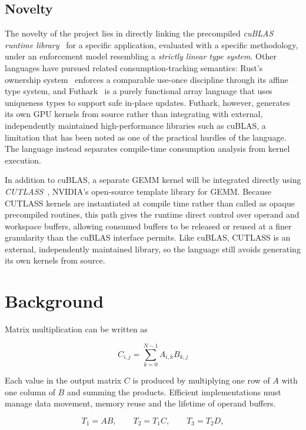\documentclass[a4paper]{article}
\begin{document}
	\subsection{Novelty}
	
	The novelty of the project lies in directly linking the precompiled \emph{cuBLAS runtime library}~\cite{cublas} for a specific application, evaluated with a specific methodology, under an enforcement model resembling a \emph{strictly linear type system}. Other languages have pursued related consumption-tracking semantics: Rust's ownership system~\cite{rust} enforces a comparable use-once discipline through its affine type system, and Futhark~\cite{futhark} is a purely functional array language that uses uniqueness types to support safe in-place updates. Futhark, however, generates its own GPU kernels from source rather than integrating with external, independently maintained high-performance libraries such as cuBLAS, a limitation that has been noted as one of the practical hurdles of the language. The language instead separates compile-time consumption analysis from kernel execution.

	In addition to cuBLAS, a separate GEMM kernel will be integrated directly using \emph{CUTLASS}~\cite{cutlass}, NVIDIA's open-source template library for GEMM. Because CUTLASS kernels are instantiated at compile time rather than called as opaque precompiled routines, this path gives the runtime direct control over operand and workspace buffers, allowing consumed buffers to be released or reused at a finer granularity than the cuBLAS interface permits. Like cuBLAS, CUTLASS is an external, independently maintained library, so the language still avoids generating its own kernels from source.
	
	\section{Background}
	
	Matrix multiplication can be written as
	
	\begin{equation}
		C_{i,j} = \sum_{k=0}^{N-1} A_{i,k}B_{k,j}
	\end{equation}
	
	Each value in the output matrix $C$ is produced by multiplying one row of $A$ with one column of $B$ and summing the products. Efficient implementations must manage data movement, memory reuse and the lifetime of operand buffers.
	
	\begin{equation}
		T_1 = A B,\qquad
		T_2 = T_1 C,\qquad
		T_3 = T_2 D,
	\end{equation}
	
\end{document}
